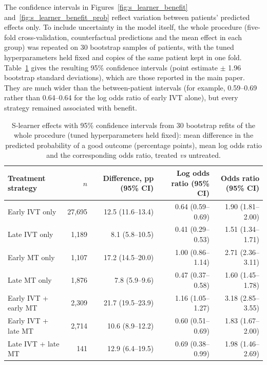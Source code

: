 The confidence intervals in Figures~\ref{fig:s_learner_benefit} and~\ref{fig:s_learner_benefit_prob} reflect variation between patients' predicted effects only. To include uncertainty in the model itself, the whole procedure (five-fold cross-validation, counterfactual predictions and the mean effect in each group) was repeated on 30 bootstrap samples of patients, with the tuned hyperparameters held fixed and copies of the same patient kept in one fold. Table~\ref{tab:sl_bootstrap} gives the resulting 95\% confidence intervals (point estimate $\pm$ 1.96 bootstrap standard deviations), which are those reported in the main paper. They are much wider than the between-patient intervals (for example, 0.59--0.69 rather than 0.64--0.64 for the log odds ratio of early IVT alone), but every strategy remained associated with benefit.

\begin{table}[htbp]
\centering
\footnotesize
\caption{S-learner effects with 95\% confidence intervals from 30 bootstrap refits of the whole procedure (tuned hyperparameters held fixed): mean difference in the predicted probability of a good outcome (percentage points), mean log odds ratio and the corresponding odds ratio, treated \textit{vs} untreated.}
\label{tab:sl_bootstrap}
\begin{tabular}{@{}lrrrr@{}}
\toprule
Treatment strategy & $n$ & Difference, pp (95\% CI) & Log odds ratio (95\% CI) & Odds ratio (95\% CI) \\
\midrule
Early IVT only & 27,695 & 12.5 (11.6--13.4) & 0.64 (0.59--0.69) & 1.90 (1.81--2.00) \\
Late IVT only & 1,189 & 8.1 (5.8--10.5) & 0.41 (0.29--0.53) & 1.51 (1.34--1.71) \\
Early MT only & 1,107 & 17.2 (14.5--20.0) & 1.00 (0.86--1.14) & 2.71 (2.36--3.11) \\
Late MT only & 1,876 & 7.8 (5.9--9.6) & 0.47 (0.37--0.58) & 1.60 (1.45--1.78) \\
Early IVT + early MT & 2,309 & 21.7 (19.5--23.9) & 1.16 (1.05--1.27) & 3.18 (2.85--3.55) \\
Early IVT + late MT & 2,714 & 10.6 (8.9--12.2) & 0.60 (0.51--0.69) & 1.83 (1.67--2.00) \\
Late IVT + late MT & 141 & 12.9 (6.4--19.5) & 0.69 (0.38--0.99) & 1.98 (1.46--2.69) \\
\bottomrule
\end{tabular}
\end{table}

